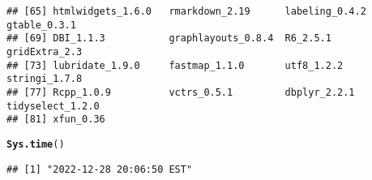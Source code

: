 \documentclass{article}\usepackage[]{graphicx}\usepackage[]{xcolor}
\makeatletter
\newcommand{\hlstd}[1]{\textcolor[rgb]{0.345,0.345,0.345}{#1}}%
\newcommand{\hlkwd}[1]{\textcolor[rgb]{0.737,0.353,0.396}{\textbf{#1}}}%
\newenvironment{kframe}{%
 \def\at@end@of@kframe{}%
 \ifinner\ifhmode%
  \def\at@end@of@kframe{\end{minipage}}%
  \begin{minipage}{\columnwidth}%
 \fi\fi%
 \def\FrameCommand##1{\hskip\@totalleftmargin \hskip-\fboxsep
 \colorbox{shadecolor}{##1}\hskip-\fboxsep
     \hskip-\linewidth \hskip-\@totalleftmargin \hskip\columnwidth}%
 \MakeFramed {\advance\hsize-\width
   \@totalleftmargin\z@ \linewidth\hsize
   \@setminipage}}%
 {\par\unskip\endMakeFramed%
 \at@end@of@kframe}
\newenvironment{knitrout}{}{} %
\makeatother
\begin{document}
\begin{knitrout}
\begin{kframe}
\begin{verbatim}
## [65] htmlwidgets_1.6.0   rmarkdown_2.19      labeling_0.4.2      gtable_0.3.1       
## [69] DBI_1.1.3           graphlayouts_0.8.4  R6_2.5.1            gridExtra_2.3      
## [73] lubridate_1.9.0     fastmap_1.1.0       utf8_1.2.2          stringi_1.7.8      
## [77] Rcpp_1.0.9          vctrs_0.5.1         dbplyr_2.2.1        tidyselect_1.2.0   
## [81] xfun_0.36
\end{verbatim}
\begin{alltt}
\hlkwd{Sys.time}\hlstd{()}
\end{alltt}
\begin{verbatim}
## [1] "2022-12-28 20:06:50 EST"
\end{verbatim}
\end{kframe}
\end{knitrout}
\end{document}
